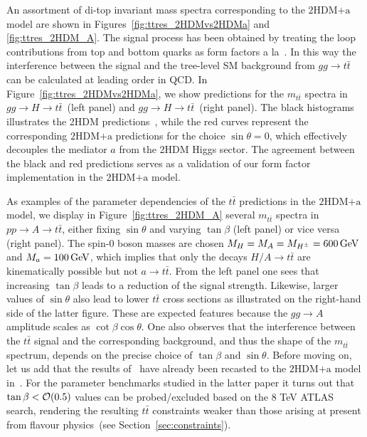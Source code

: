 \documentclass[a4paper, 11pt,notoc]{article}
\newcommand{\mA}{\ensuremath{M_{A}}\xspace}
\newcommand{\ma}{\ensuremath{M_{a}}\xspace}
\newcommand{\mH}{\ensuremath{M_{H}}\xspace}
\newcommand{\mHc}{\ensuremath{M_{H^{\pm}}}\xspace}
\newcommand{\hdma}{\ensuremath{\textrm{2HDM+a}}\xspace}
\begin{document}
An assortment of di-top invariant mass spectra corresponding to the \hdma model are shown in Figures~\ref{fig:ttres_2HDMvs2HDMa} and \ref{fig:ttres_2HDM_A}. The signal process has been obtained by treating the loop contributions from top and bottom quarks as form factors a la~\cite{FranzosiZhang}. In this way the interference between the signal and the tree-level SM background from $gg \to t \bar t$ can be calculated at leading order in QCD. In Figure~\ref{fig:ttres_2HDMvs2HDMa}, we show predictions for the $m_{t \bar t}$ spectra in $gg \to H \to t \bar t$~(left panel) and $gg \to H \to t \bar t$~(right panel). The black histograms illustrates the 2HDM predictions~\cite{Aaboud:2017hnm}, while the red curves represent the corresponding \hdma predictions for the choice $\sin \theta = 0$, which effectively decouples the mediator $a$ from the 2HDM Higgs sector. The agreement between the black and red predictions serves as a validation of our form factor implementation in the \hdma model. 

As examples of the parameter {\color{green} dependencies} of the $t \bar t$ predictions in the \hdma model, we display in  Figure~\ref{fig:ttres_2HDM_A} several $m_{t \bar t}$ spectra in $pp \to A \to t \bar t$, either fixing $\sin \theta$ and varying $\tan \beta$ (left panel) or vice versa (right panel). The  {\color{red} spin-0 boson}  masses are chosen $\mH=\mA=\mHc =600 \, {\rm GeV}$ and $\ma=100 \, {\rm GeV}$, which implies that only the  decays $H/A \to t \bar t$  are kinematically possible but not $a \to t \bar t$.  From the left panel one sees that increasing $\tan \beta$ leads  to a reduction of the signal strength.  Likewise, larger values of $\sin \theta$ also lead to lower $t \bar t$ cross sections as illustrated on the right-hand side of the latter figure. These are expected features because the $g g \to A$ amplitude  scales as $\cot \beta \cos \theta$.  One also observes that the interference between the $t \bar t$ signal and the corresponding background, and thus the shape of the $m_{t \bar t}$ spectrum, depends on the precise choice of $\tan \beta$  and $\sin \theta$.  Before moving on, let us add that the results of~\cite{Aaboud:2017hnm} have already been recasted to the \hdma model in~\cite{Bauer:2017ota}. For the parameter benchmarks studied in the latter paper it turns out that $\tan \beta < {\cal O} ( 0.5)$ values can be probed/excluded based on the 8 TeV ATLAS search, rendering the resulting $t \bar t$ constraints weaker than those arising at present from flavour physics~(see Section~\ref{sec:constraints}). 
\end{document}
